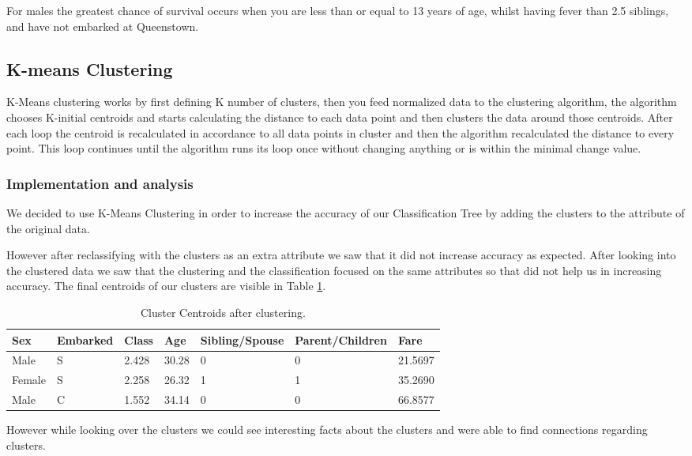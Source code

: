 \documentclass[a4paper,11pt]{article}
\begin{document}
For males the greatest chance of survival occurs when you are less than or equal to 13 years of age, whilst having fever than 2.5 siblings, and have not embarked at Queenstown.
\subsection{K-means Clustering}
K-Means clustering\cite[p.451]{DataMinBook} works by first defining K number of clusters, then you feed normalized data to the clustering algorithm, the algorithm chooses K-initial centroids and starts calculating the distance to each data point and then clusters the data around those centroids. After each loop the centroid is recalculated in accordance to all data points in cluster and then the algorithm recalculated the distance to every point. This loop continues until the algorithm runs its loop once without changing anything or is within the minimal change value.
\subsubsection{Implementation and analysis}
We decided to use K-Means Clustering in order to increase the accuracy of our Classification Tree by adding the clusters to the attribute of the original data.

However after reclassifying with the clusters as an extra attribute we saw that it did not increase accuracy as expected. After looking into the clustered data we saw that the clustering and the classification focused on the same attributes so that did not help us in increasing accuracy. The final centroids of our clusters are visible in Table \ref{clusterCentroids}.

\begin{table}[h]
\begin{tabular}{|l|l|l|l|l|l|l|}
\hline
Sex & Embarked & Class & Age & Sibling/Spouse & Parent/Children & Fare\\
\hline
Male & S & 2.428 & 30.28 & 0 & 0 & 21.5697\\
Female & S & 2.258 & 26.32 & 1 & 1 & 35.2690\\
Male & C & 1.552 & 34.14 & 0 & 0 & 66.8577\\
\hline
\end{tabular}
\caption{Cluster Centroids after clustering.}
\label{clusterCentroids}
\end{table}

However while looking over the clusters we could see interesting facts about the clusters and were able to find connections regarding clusters.
\end{document}
